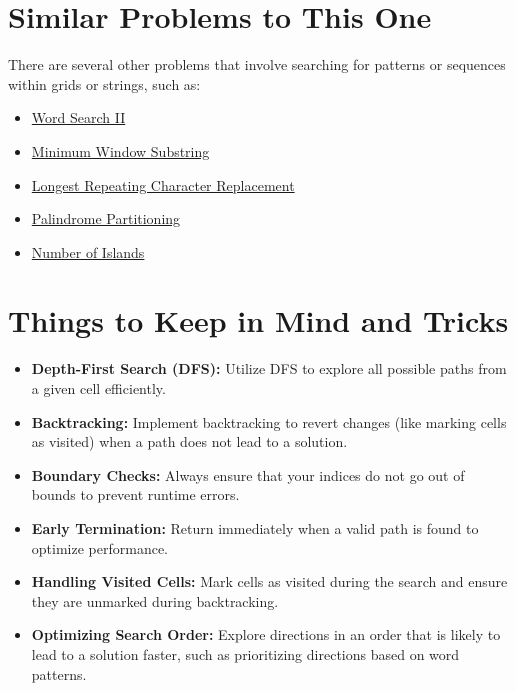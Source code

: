 \section*{Similar Problems to This One}

There are several other problems that involve searching for patterns or sequences within grids or strings, such as:

\begin{itemize}
    \item \hyperref[problem:word_search_ii]{Word Search II}
    \item \hyperref[problem:minimum_window_substring]{Minimum Window Substring}
    \item \hyperref[problem:longest_repeating_character_replacement]{Longest Repeating Character Replacement}
    \item \hyperref[problem:palindrome_partitioning]{Palindrome Partitioning}
    \item \hyperref[problem:number_of_islands]{Number of Islands}
\end{itemize}

\section*{Things to Keep in Mind and Tricks}

\begin{itemize}
    \item \textbf{Depth-First Search (DFS):} Utilize DFS to explore all possible paths from a given cell efficiently.
    
    \item \textbf{Backtracking:} Implement backtracking to revert changes (like marking cells as visited) when a path does not lead to a solution.
    
    \item \textbf{Boundary Checks:} Always ensure that your indices do not go out of bounds to prevent runtime errors.
    
    \item \textbf{Early Termination:} Return immediately when a valid path is found to optimize performance.
    
    \item \textbf{Handling Visited Cells:} Mark cells as visited during the search and ensure they are unmarked during backtracking.
    
    \item \textbf{Optimizing Search Order:} Explore directions in an order that is likely to lead to a solution faster, such as prioritizing directions based on word patterns.
\end{itemize}

